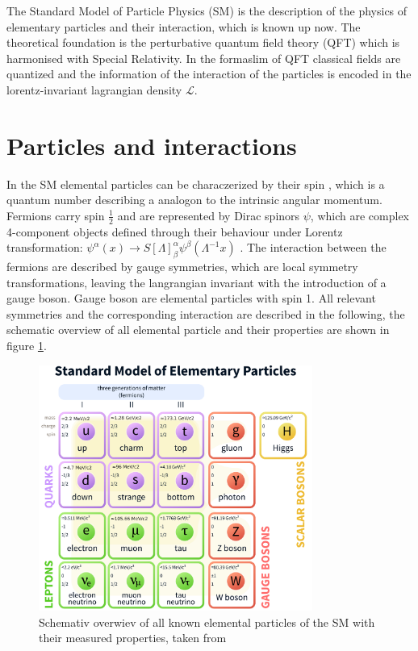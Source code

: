 The Standard Model of Particle Physics (\acs{SM}) \cite{SM} is the description of the physics of elementary particles and their interaction, which is known up now. The theoretical foundation is the perturbative quantum field theory (\acs{QFT}) which is harmonised with Special Relativity. In the formaslim of \acs{QFT} classical fields are quantized and the information of the interaction of the particles is encoded in the lorentz-invariant lagrangian density $\mathcal{L}$. 



\section{Particles and interactions}
\label{sec:section_1_1}

In the \acs{SM} elemental particles can be characzerized by their spin \cite{SPIN}, which is a quantum number describing a analogon to the intrinsic angular momentum. Fermions carry spin $\frac{1}{2}$ and are represented by Dirac spinors $\psi$, which are complex 4-component objects defined through their behaviour under Lorentz transformation: $\psi^{\alpha}(x) \rightarrow S[\Lambda]^{\alpha}_{\beta} \psi^{\beta}(\Lambda^{-1}x)$ \cite{spinor}. The interaction between the fermions are described by gauge symmetries, which are local symmetry transformations, leaving the langrangian invariant with the introduction of a gauge boson. Gauge boson are elemental particles with spin 1. All relevant symmetries and the corresponding interaction are described in the following, the schematic overview of all elemental particle and their properties are shown in figure \ref{fig:fig_1_1}.


\begin{figure}[ht]
	\centering
	\includegraphics[width=0.8\textwidth]{pictures/Standard_Model_of_Elementary_Particles.pdf}

	\caption[Schemativ overwiev of Standard Model particles]{Schemativ overwiev of all known elemental particles of the \acs{SM} with their measured properties, taken from \cite{SMPARTICLES}}
	\label{fig:fig_1_1}
\end{figure}


